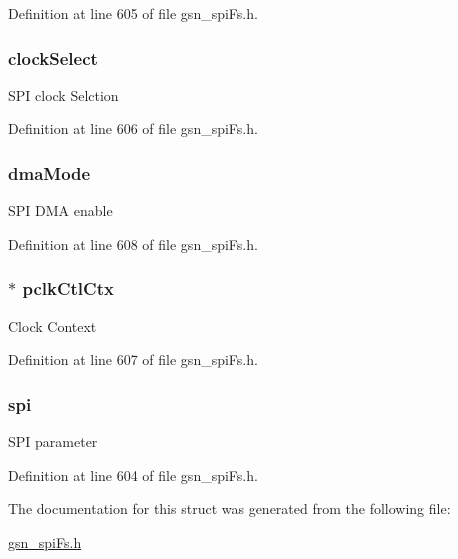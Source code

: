 Definition at line 605 of file gsn\_\-spiFs.h.

\hypertarget{a00234_aafc9460aea176e2b77f84f6d8505b5dc}{
\subsubsection[{clockSelect}]{ {\bf clockSelect}}}
\label{a00234_aafc9460aea176e2b77f84f6d8505b5dc}
SPI clock Selction 

Definition at line 606 of file gsn\_\-spiFs.h.

\hypertarget{a00234_ac51b04e9415de12b2e97604acf5c3adc}{
\subsubsection[{dmaMode}]{ {\bf dmaMode}}}
\label{a00234_ac51b04e9415de12b2e97604acf5c3adc}
SPI DMA enable 

Definition at line 608 of file gsn\_\-spiFs.h.

\hypertarget{a00234_a87fd9dda5636bd71a412693b96fed177}{
\subsubsection[{pclkCtlCtx}]{$\ast$ {\bf pclkCtlCtx}}}
\label{a00234_a87fd9dda5636bd71a412693b96fed177}
Clock Context 

Definition at line 607 of file gsn\_\-spiFs.h.

\hypertarget{a00234_a14e4b696104ff7e1399948a31301abc2}{
\subsubsection[{spi}]{ {\bf spi}}}
\label{a00234_a14e4b696104ff7e1399948a31301abc2}
SPI parameter 

Definition at line 604 of file gsn\_\-spiFs.h.



The documentation for this struct was generated from the following file:\begin{DoxyCompactItemize}
\item 
\hyperlink{a00589}{gsn\_\-spiFs.h}\end{DoxyCompactItemize}
